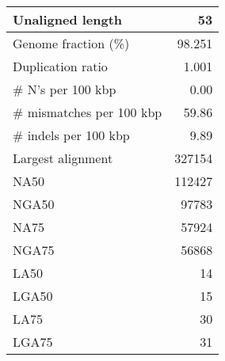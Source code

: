 \documentclass[12pt,a4paper]{article}
\begin{document}
\begin{table}[ht]
\begin{center}
\begin{tabular}{|l*{1}{|r}|}
Unaligned length & 53 \\ \hline
Genome fraction (\%) & 98.251 \\ \hline
Duplication ratio & 1.001 \\ \hline
\# N's per 100 kbp & 0.00 \\ \hline
\# mismatches per 100 kbp & 59.86 \\ \hline
\# indels per 100 kbp & 9.89 \\ \hline
Largest alignment & 327154 \\ \hline
NA50 & 112427 \\ \hline
NGA50 & 97783 \\ \hline
NA75 & 57924 \\ \hline
NGA75 & 56868 \\ \hline
LA50 & 14 \\ \hline
LGA50 & 15 \\ \hline
LA75 & 30 \\ \hline
LGA75 & 31 \\ \hline
\end{tabular}
\end{center}
\end{table}
\end{document}
